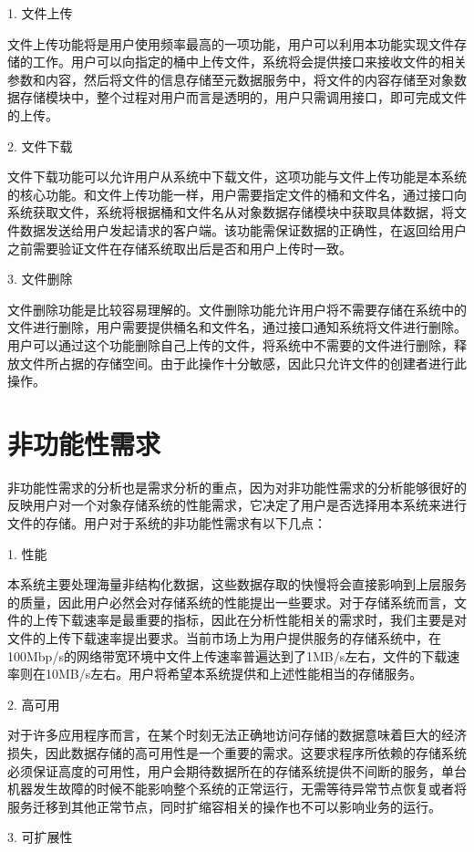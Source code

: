 1. 文件上传

文件上传功能将是用户使用频率最高的一项功能，用户可以利用本功能实现文件存储的工作。用户可以向指定的桶中上传文件，系统将会提供接口来接收文件的相关参数和内容，然后将文件的信息存储至元数据服务中，将文件的内容存储至对象数据存储模块中，整个过程对用户而言是透明的，用户只需调用接口，即可完成文件的上传。

2. 文件下载

文件下载功能可以允许用户从系统中下载文件，这项功能与文件上传功能是本系统的核心功能。和文件上传功能一样，用户需要指定文件的桶和文件名，通过接口向系统获取文件，系统将根据桶和文件名从对象数据存储模块中获取具体数据，将文件数据发送给用户发起请求的客户端。该功能需保证数据的正确性，在返回给用户之前需要验证文件在存储系统取出后是否和用户上传时一致。

3. 文件删除

文件删除功能是比较容易理解的。文件删除功能允许用户将不需要存储在系统中的文件进行删除，用户需要提供桶名和文件名，通过接口通知系统将文件进行删除。用户可以通过这个功能删除自己上传的文件，将系统中不需要的文件进行删除，释放文件所占据的存储空间。由于此操作十分敏感，因此只允许文件的创建者进行此操作。

\section{非功能性需求}
非功能性需求的分析也是需求分析的重点，因为对非功能性需求的分析能够很好的反映用户对一个对象存储系统的性能需求，它决定了用户是否选择用本系统来进行文件的存储。用户对于系统的非功能性需求有以下几点：

1. 性能

本系统主要处理海量非结构化数据，这些数据存取的快慢将会直接影响到上层服务的质量，因此用户必然会对存储系统的性能提出一些要求。对于存储系统而言，文件的上传下载速率是最重要的指标，因此在分析性能相关的需求时，我们主要是对文件的上传下载速率提出要求。当前市场上为用户提供服务的存储系统中，在100Mbp/s的网络带宽环境中文件上传速率普遍达到了1MB/s左右，文件的下载速率则在10MB/s左右。用户将希望本系统提供和上述性能相当的存储服务。

2. 高可用

对于许多应用程序而言，在某个时刻无法正确地访问存储的数据意味着巨大的经济损失，因此数据存储的高可用性是一个重要的需求。这要求程序所依赖的存储系统必须保证高度的可用性，用户会期待数据所在的存储系统提供不间断的服务，单台机器发生故障的时候不能影响整个系统的正常运行，无需等待异常节点恢复或者将服务迁移到其他正常节点，同时扩缩容相关的操作也不可以影响业务的运行。

3. 可扩展性

